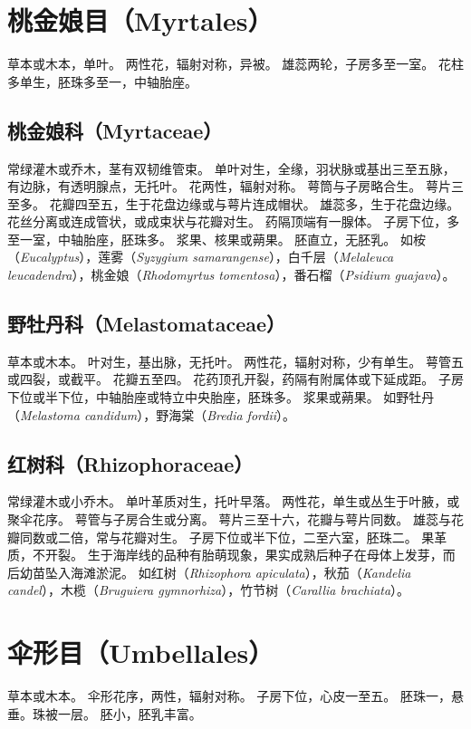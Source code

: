 \documentclass[11pt]{article}
\begin{document}
\begin{sloppypar}
\section{桃金娘目（Myrtales）}
草本或木本，单叶。
两性花，辐射对称，异被。
雄蕊两轮，子房多至一室。
花柱多单生，胚珠多至一，中轴胎座。

\subsection{桃金娘科（Myrtaceae）}
常绿灌木或乔木，茎有双韧维管束。
单叶对生，全缘，羽状脉或基出三至五脉，有边脉，有透明腺点，无托叶。
花两性，辐射对称。
萼筒与子房略合生。
萼片三至多。
花瓣四至五，生于花盘边缘或与萼片连成帽状。
雄蕊多，生于花盘边缘。
花丝分离或连成管状，或成束状与花瓣对生。
药隔顶端有一腺体。
子房下位，多至一室，中轴胎座，胚珠多。
浆果、核果或蒴果。
胚直立，无胚乳。
如桉（\textit{Eucalyptus}），莲雾（\textit{Syzygium samarangense}），白千层（\textit{Melaleuca leucadendra}），桃金娘（\textit{Rhodomyrtus tomentosa}），番石榴（\textit{Psidium guajava}）。

\subsection{野牡丹科（Melastomataceae）}
草本或木本。
叶对生，基出脉，无托叶。
两性花，辐射对称，少有单生。
萼管五或四裂，或截平。
花瓣五至四。
花药顶孔开裂，药隔有附属体或下延成距。
子房下位或半下位，中轴胎座或特立中央胎座，胚珠多。
浆果或蒴果。
如野牡丹（\textit{Melastoma candidum}），野海棠（\textit{Bredia fordii}）。

\subsection{红树科（Rhizophoraceae）}
常绿灌木或小乔木。
单叶革质对生，托叶早落。
两性花，单生或丛生于叶腋，或聚伞花序。
萼管与子房合生或分离。
萼片三至十六，花瓣与萼片同数。
雄蕊与花瓣同数或二倍，常与花瓣对生。
子房下位或半下位，二至六室，胚珠二。
果革质，不开裂。
生于海岸线的品种有胎萌现象，果实成熟后种子在母体上发芽，而后幼苗坠入海滩淤泥。
如红树（\textit{Rhizophora apiculata}），秋茄（\textit{Kandelia candel}），木榄（\textit{Bruguiera gymnorhiza}），竹节树（\textit{Carallia brachiata}）。

\section{伞形目（Umbellales）}
草本或木本。
伞形花序，两性，辐射对称。
子房下位，心皮一至五。
胚珠一，悬垂。珠被一层。
胚小，胚乳丰富。


\end{sloppypar}
\end{document}
